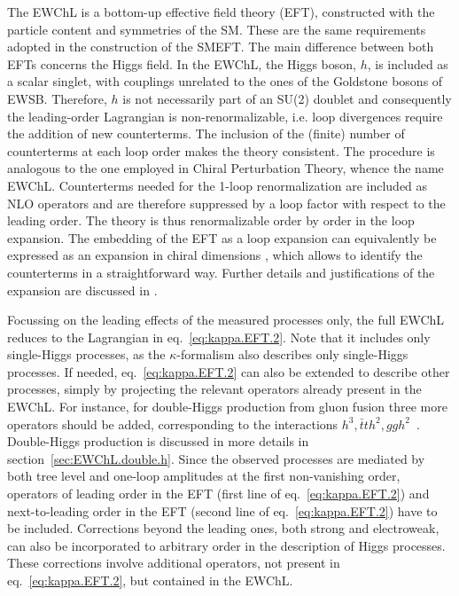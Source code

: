 The EWChL\cite{Dobado:1989ax,Dobado:1989ue,Dobado:1990zh,Dobado:1990jy,Espriu:1991vm,Herrero:1993nc,Herrero:1994iu,Feruglio:1992wf,Bagger:1993zf,Koulovassilopoulos:1993pw,Burgess:1999ha,Wang:2006im,Grinstein:2007iv,Azatov:2012bz,Alonso:2012px,Buchalla:2012qq,Buchalla:2013rka,Buchalla:2013eza} is a bottom-up effective field theory (EFT), constructed with the particle content and symmetries of the SM. These are the same requirements adopted in the construction of the SMEFT. The main difference between both EFTs concerns the Higgs field. In the EWChL, the Higgs boson, $h$, is included as a scalar singlet, with couplings unrelated to the ones of the Goldstone bosons of EWSB. Therefore, $h$ is not necessarily part of an SU(2) doublet and consequently the leading-order Lagrangian is non-renormalizable, i.e. loop divergences require the addition of new counterterms. The inclusion of the (finite) number of counterterms at each loop order makes the theory consistent. The procedure is analogous to the one employed in Chiral Perturbation Theory, whence the name EWChL. Counterterms needed for the 1-loop renormalization\cite{Guo:2015isa,Buchalla:2017jlu,Alonso:2017tdy} are included as NLO operators\cite{Buchalla:2013rka} and are therefore suppressed by a loop factor with respect to the leading order. The theory is thus renormalizable order by order in the loop expansion. The embedding of the EFT as a loop expansion can equivalently be expressed as an expansion in chiral dimensions \cite{Buchalla:2013eza}, which allows to identify the counterterms in a straightforward way. Further details and justifications of the expansion are discussed in \cite{Buchalla:2013rka,Buchalla:2013eza,Buchalla:2015wfa,Buchalla:2016sop}.

Focussing on the leading effects of the measured processes only, the full EWChL reduces to the Lagrangian in eq.~\eqref{eq:kappa.EFT.2}. Note that it includes only single-Higgs processes, as the $\kappa$-formalism also describes only single-Higgs processes. If needed, eq.~\eqref{eq:kappa.EFT.2} can also be extended to describe other processes, simply by projecting the relevant operators already present in the EWChL. For instance, for double-Higgs production from gluon fusion three more operators should be added, corresponding to the interactions $h^{3},\bar{t}th^{2},ggh^{2}$~\cite{Grober:2015cwa,deFlorian:2016spz,Kim:2018uty,Buchalla:2018yce}. Double-Higgs production is discussed in more details in section~\ref{sec:EWChL.double.h}. Since the observed processes are mediated by both tree level and one-loop amplitudes at the first non-vanishing order, operators of leading order in the EFT (first line of eq.~\eqref{eq:kappa.EFT.2}) and next-to-leading order in the EFT (second line of eq.~\eqref{eq:kappa.EFT.2}) have to be included\cite{Buchalla:2015wfa}. Corrections beyond the leading ones, both strong and electroweak, can also be incorporated to arbitrary order in the description of Higgs processes. These corrections involve additional operators, not present in eq.~\eqref{eq:kappa.EFT.2}, but contained in the EWChL.

